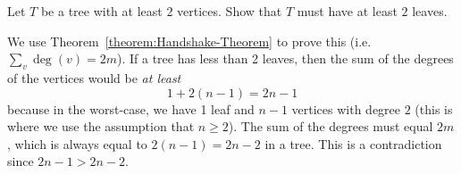 \begin{flex}
\label{grp:exercise:A-tree-has-at-least-2-leaves}

\begin{exercise}
\label{exercise:A-tree-has-at-least-2-leaves}
Let $T$ be a tree with at least $2$ vertices. Show that $T$ must have at least $2$ leaves.

\end{exercise}

\begin{solution}
\label{sol:intro-to-graph-theory::handshake-theorem}
We use Theorem~\ref{theorem:Handshake-Theorem} to prove this (i.e. $\sum_v \deg(v) = 2m$). If a tree has less than 2 leaves, then the sum of the degrees of the vertices would be \emph{at least} $$1 + 2(n-1) = 2n - 1$$ because in the worst-case, we have 1 leaf and $n-1$ vertices with degree $2$ (this is where we use the assumption that $n \geq 2$). The sum of the degrees must equal $2m$, which is always equal to $2(n-1) = 2n - 2$ in a tree. This is a contradiction since $2n-1 > 2n-2$.

\end{solution}
\end{flex}

